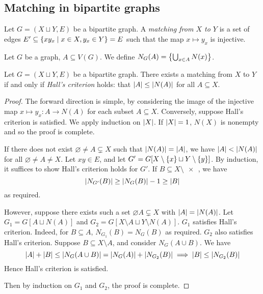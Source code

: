 \subsection{Matching in bipartite graphs}
\begin{definition}
	Let \( G = (X \sqcup Y, E) \) be a bipartite graph.
	A \emph{matching from \( X \) to \( Y \)} is a set of edges \( E' \subseteq \qty{xy_x \mid x \in X, y_x \in Y} = E \) such that the map \( x \mapsto y_x \) is injective.
\end{definition}
\begin{definition}
	Let \( G \) be a graph, \( A \subseteq V(G) \).
	We define \( N_G(A) = \qty{\bigcup_{x \in A} N(x)} \).
\end{definition}
\begin{theorem}[Hall]
	Let \( G = (X \sqcup Y, E) \) be a bipartite graph.
	There exists a matching from \( X \) to \( Y \) if and only if \emph{Hall's criterion} holds: that \( \abs{A} \leq \abs{N(A)} \) for all \( A \subseteq X \).
\end{theorem}
\begin{proof}
	The forward direction is simple, by considering the image of the injective map \( x \mapsto y_x : A \to N(A) \) for each subset \( A \subseteq X \).
	Conversely, suppose Hall's criterion is satisfied.
	We apply induction on \( \abs{X} \).
	If \( \abs{X} = 1 \), \( N(X) \) is nonempty and so the proof is complete.

	If there does not exist \( \varnothing \neq A \subsetneq X \) such that \( \abs{N(A)} = \abs{A} \), we have \( \abs{A} < \abs{N(A)} \) for all \( \varnothing \neq A \neq X \).
	Let \( xy \in E \), and let \( G' = G[X \setminus \qty{x} \sqcup Y \setminus \qty{y}] \).
	By induction, it suffices to show Hall's criterion holds for \( G' \).
	If \( B \subseteq X \setminus \qty{x} \), we have
	\[ \abs{N_{G'}(B)} \geq \abs{N_G(B)} - 1 \geq \abs{B} \]
	as required.

	However, suppose there exists such a set \( \varnothing A \subsetneq X \) with \( \abs{A} = \abs{N(A)} \).
	Let \( G_1 = G[A \sqcup N(A)] \) and \( G_2 = G[X \setminus A \sqcup Y \setminus N(A)] \).
	\( G_1 \) satisfies Hall's criterion.
	Indeed, for \( B \subseteq A \), \( N_{G_1}(B) = N_G(B) \) as required.
	\( G_2 \) also satisfies Hall's criterion.
	Suppose \( B \subseteq X \setminus A \), and consider \( N_G(A \cup B) \).
	We have
	\[ \abs{A} + \abs{B} \leq \abs{N_G(A \cup B)} = \abs{N_G(A)} + \abs{N_{G_2}(B)} \implies \abs{B} \leq \abs{N_{G_2}(B)} \]
	Hence Hall's criterion is satisfied.

	Then by induction on \( G_1 \) and \( G_2 \), the proof is complete.
\end{proof}
